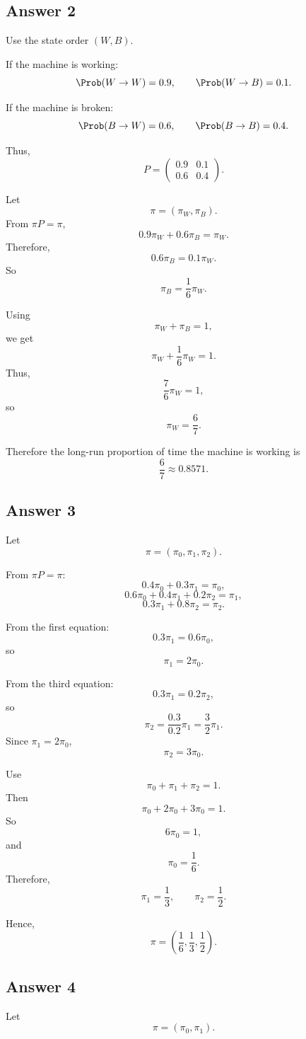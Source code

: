 \documentclass[12pt,a4paper]{article}
\theoremstyle{notestyle}
\begin{document}
\subsection*{Answer 2}

Use the state order $(W,B)$.

If the machine is working:
\[
\Prob(W\to W)=0.9,
\qquad
\Prob(W\to B)=0.1.
\]

If the machine is broken:
\[
\Prob(B\to W)=0.6,
\qquad
\Prob(B\to B)=0.4.
\]

Thus,
\[
P=
\begin{pmatrix}
0.9 & 0.1\\
0.6 & 0.4
\end{pmatrix}.
\]

Let
\[
\pi=(\pi_W,\pi_B).
\]
From $\pi P=\pi$,
\[
0.9\pi_W+0.6\pi_B=\pi_W.
\]
Therefore,
\[
0.6\pi_B=0.1\pi_W.
\]
So
\[
\pi_B=\frac{1}{6}\pi_W.
\]

Using
\[
\pi_W+\pi_B=1,
\]
we get
\[
\pi_W+\frac16\pi_W=1.
\]
Thus,
\[
\frac76\pi_W=1,
\]
so
\[
\pi_W=\frac67.
\]

Therefore the long-run proportion of time the machine is working is
\[
\boxed{\frac67\approx 0.8571.}
\]

\subsection*{Answer 3}

Let
\[
\pi=(\pi_0,\pi_1,\pi_2).
\]

From $\pi P=\pi$:
\[
0.4\pi_0+0.3\pi_1=\pi_0,
\]
\[
0.6\pi_0+0.4\pi_1+0.2\pi_2=\pi_1,
\]
\[
0.3\pi_1+0.8\pi_2=\pi_2.
\]

From the first equation:
\[
0.3\pi_1=0.6\pi_0,
\]
so
\[
\pi_1=2\pi_0.
\]

From the third equation:
\[
0.3\pi_1=0.2\pi_2,
\]
so
\[
\pi_2=\frac{0.3}{0.2}\pi_1=\frac32\pi_1.
\]
Since $\pi_1=2\pi_0$,
\[
\pi_2=3\pi_0.
\]

Use
\[
\pi_0+\pi_1+\pi_2=1.
\]
Then
\[
\pi_0+2\pi_0+3\pi_0=1.
\]
So
\[
6\pi_0=1,
\]
and
\[
\pi_0=\frac16.
\]
Therefore,
\[
\pi_1=\frac13,
\qquad
\pi_2=\frac12.
\]

Hence,
\[
\boxed{\pi=\left(\frac16,\frac13,\frac12\right).}
\]

\subsection*{Answer 4}

Let
\[
\pi=(\pi_0,\pi_1).
\]
\end{document}
